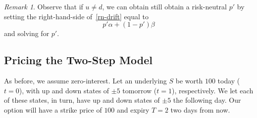 \documentclass[12pt]{article}
\theoremstyle{plain}
\theoremstyle{definition}
\theoremstyle{remark}
\newtheorem*{remark}{Remark}
\numberwithin{equation}{section}  %
\begin{document}
	\begin{remark}
		Observe that if $u \neq d$, we can obtain still obtain a risk-neutral $p'$
		by setting the right-hand-side of~\eqref{rn-drift} equal to 
		\[p' \alpha + (1-p')\beta \] and solving for $p'$. 
	\end{remark}
	\subsection{Pricing the Two-Step Model}
	As before, we assume zero-interest. Let an underlying $S$ be worth
	$100$ today ($t=0$), with up and down states of $\pm 5$ tomorrow ($t=1$), respectively.  We let each of these states, in turn, have up and down states of
	$\pm 5$ the following day. Our option will have a strike price of $100$
	and expiry $T = 2$ two days from now. 
\end{document}

